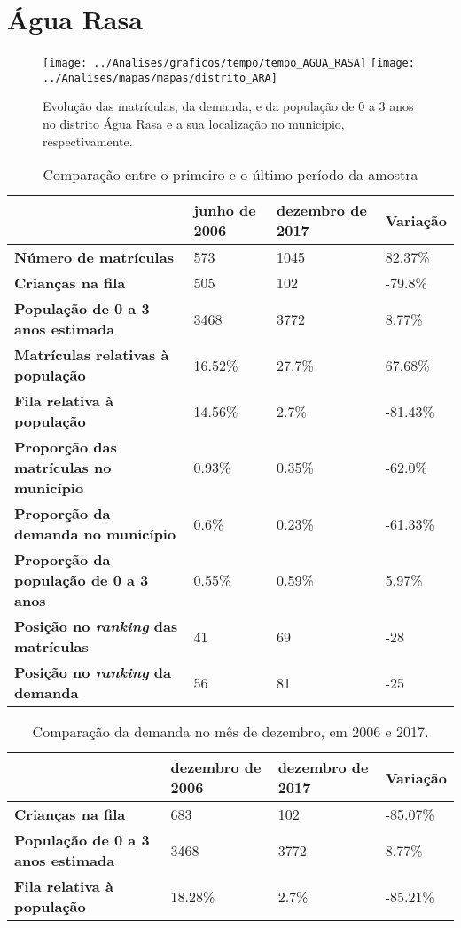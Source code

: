 \section{Água Rasa}
\begin{figure}[H]
\centering
\texttt{[image: ../Analises/graficos/tempo/tempo\_AGUA\_RASA]}
\texttt{[image: ../Analises/mapas/mapas/distrito\_ARA]}
\caption{Evolução das matrículas, da demanda, e da população de 0 a 3 anos no distrito Água Rasa e a sua localização no município, respectivamente.}
\end{figure}
\begin{table}[H]
\begin{tabular}{l|l|l|l}
\textbf{}                                      & \textbf{junho de 2006}       & \textbf{dezembro de 2017}    & \textbf{Variação} \\ \hline
\textbf{Número de matrículas}                  & 573 & 1045 & 82.37\% \\ \hline
\textbf{Crianças na fila}                      & 505 & 102 & -79.8\% \\ \hline
\textbf{População de 0 a 3 anos estimada}      & 3468 & 3772 & 8.77\% \\ \hline
\textbf{Matrículas relativas à população}      & 16.52\% & 27.7\% & 67.68\% \\ \hline
\textbf{Fila relativa à população}             & 14.56\% & 2.7\% & -81.43\% \\ \hline
\textbf{Proporção das matrículas no município} & 0.93\% & 0.35\% & -62.0\% \\ \hline
\textbf{Proporção da demanda no município}     & 0.6\% & 0.23\% & -61.33\% \\ \hline
\textbf{Proporção da população de 0 a 3 anos}  & 0.55\% & 0.59\% & 5.97\% \\ \hline
\textbf{Posição no \textit{ranking} das matrículas}     & 41 & 69 & -28 \\ \hline
\textbf{Posição no \textit{ranking} da demanda}         & 56 & 81 & -25 \\ 
\end{tabular}
\caption{Comparação entre o primeiro e o último período da amostra}
\end{table}
\begin{table}[H]
\begin{tabular}{l|l|l|l}
\textbf{}                                 & \textbf{dezembro de 2006} & \textbf{dezembro de 2017} & \textbf{Variação} \\ \hline
\textbf{Crianças na fila}                      & 683 & 102 & -85.07\% \\ \hline
\textbf{População de 0 a 3 anos estimada}      & 3468 & 3772 & 8.77\% \\ \hline
\textbf{Fila relativa à população}             & 18.28\% & 2.7\% & -85.21\% \\
\end{tabular}
\caption{Comparação da demanda no mês de dezembro, em 2006 e 2017.}
\end{table}
